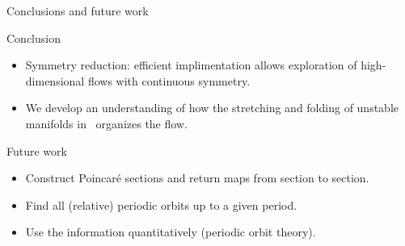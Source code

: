 \documentclass{beamer}
\begin{document}
 \begin{frame}{Conclusions and future work}
 
\begin{block}{Conclusion}
  \begin{itemize}
   \item Symmetry reduction: efficient implimentation allows exploration of high-dimensional flows with continuous symmetry.
   \item We develop an understanding of how the stretching and folding
  	of unstable manifolds in \KSe\ organizes the flow.
  \end{itemize}
\end{block}


\begin{block}{Future work}
\begin{itemize}
  \item Construct Poincar\'e sections and return maps from section to section.
  \item Find all (relative) periodic orbits up to a given period.
  \item Use the information quantitatively (periodic orbit theory).
\end{itemize}
\end{block}

\end{frame}

% 
% 
\end{document}
